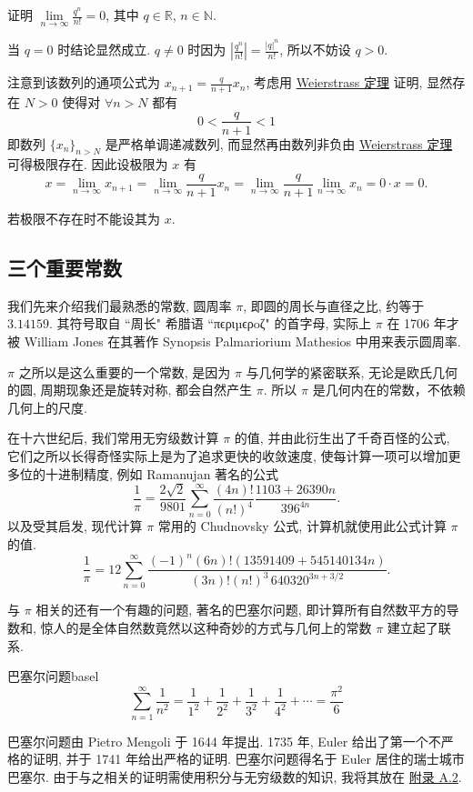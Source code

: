 \documentclass[cn,toc=twocol]{elegantbook}
\newcommand{\R}{\mathbb{R}}
\newcommand{\N}{\mathbb{N}}
\begin{document}
\begin{example}
	证明 $\lim\limits_{n \to \infty} \frac{q^n}{n!} = 0$, 其中 $q \in \R$, $n \in \N$.
\end{example}

\begin{solution}
	当 $q = 0$ 时结论显然成立. $q \neq 0$ 时因为 $\left\lvert \frac{q^n}{n!} \right\rvert = \frac{\lvert q \rvert ^n}{n!}$, 所以不妨设 $q > 0$.
	
	注意到该数列的通项公式为 $x_{n+1} = \frac{q}{n+1} x_n$, 考虑用 \hyperref[thm:R6]{Weierstrass 定理} 证明, 显然存在 $N > 0$ 使得对 $\forall n > N$ 都有 
	\[
		0 < \frac{q}{n+1} < 1
	\]
	即数列 $\{x_n\}_{n>N}$ 是严格单调递减数列, 而显然再由数列非负由 \hyperref[thm:R6]{Weierstrass 定理} 可得极限存在. 因此设极限为 $x$ 有
	\[
		x = \lim_{n\to\infty} x_{n+1} = \lim_{n\to\infty} \frac{q}{n+1} x_n = \lim_{n\to\infty} \frac{q}{n+1} \lim_{n\to\infty} x_n = 0 \cdot x = 0.
	\]
\end{solution}
\begin{remark}
	若极限不存在时不能设其为 $x$.
\end{remark}
\smallskip

\subsection{三个重要常数}

我们先来介绍我们最熟悉的常数, 圆周率 $\pi$, 即圆的周长与直径之比, 约等于 $3.14159$. 其符号取自 ``周长" 希腊语 ``πϵριµϵρoζ" 的首字母, 实际上 $\pi$ 在 1706 年才被 William Jones 在其著作 Synopsis Palmariorium Mathesios 中用来表示圆周率.

$\pi$ 之所以是这么重要的一个常数, 是因为 $\pi$ 与几何学的紧密联系, 无论是欧氏几何的圆, 周期现象还是旋转对称, 都会自然产生 $\pi$. 所以 $\pi$ 是几何内在的常数，不依赖几何上的尺度.

\smallskip

在十六世纪后, 我们常用无穷级数计算 $\pi$ 的值, 并由此衍生出了千奇百怪的公式, 它们之所以长得奇怪实际上是为了追求更快的收敛速度, 使每计算一项可以增加更多位的十进制精度, 例如 Ramanujan 著名的公式
\[
\frac{1}{\pi} = \frac{2\sqrt{2}}{9801}\sum_{n=0}^{\infty}\frac{(4n)!}{(n!)^4}\frac{1103+26390n}{396^{4n}}.
\]
以及受其启发, 现代计算 $\pi$ 常用的 Chudnovsky 公式, 计算机就使用此公式计算 $\pi$ 的值.
\[
\frac{1}{\pi} = 12\sum_{n=0}^{\infty}\frac{(-1)^n(6n)!(13591409+545140134n)}{(3n)!(n!)^3\,640320^{3n+3/2}}.
\]
\smallskip

与 $\pi$ 相关的还有一个有趣的问题, 著名的巴塞尔问题, 即计算所有自然数平方的导数和, 惊人的是全体自然数竟然以这种奇妙的方式与几何上的常数 $\pi$ 建立起了联系.
\begin{theorem}{巴塞尔问题}{basel}
	\[
		\sum_{n = 1}^{\infty} \frac{1}{n^{2}} = \frac{1}{1^{2}} + \frac{1}{2^{2}} + \frac{1}{3^{2}} + \frac{1}{4^{2}} + \cdots = \frac{\pi^{2}}{6}
	\]
\end{theorem}
巴塞尔问题由 Pietro Mengoli 于 1644 年提出. 1735 年, Euler 给出了第一个不严格的证明, 并于 1741 年给出严格的证明. 巴塞尔问题得名于 Euler 居住的瑞士城市巴塞尔. 由于与之相关的证明需使用积分与无穷级数的知识, 我将其放在 \hyperlink{A2}{附录 A.2}.
\bigskip
\end{document}
